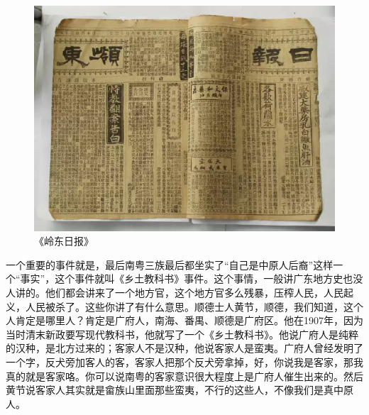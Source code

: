 \begin{figure}
	\centering
	\includegraphics[width=\textwidth]{images/image-76}
	\caption{《岭东日报》}
\end{figure}

一个重要的事件就是，最后南粤三族最后都坐实了“自己是中原人后裔”这样一个“事实”，这个事件就叫《乡土教科书》事件。这个事情，一般讲广东地方史也没人讲的。他们都会讲来了一个地方官，这个地方官多么残暴，压榨人民，人民起义，人民被杀了。这些你讲了有什么意思。顺德士人黄节，顺德，我们知道，这个人肯定是哪里人？肯定是广府人，南海、番禺、顺德是广府区。他在1907年，因为当时清末新政要写现代教科书，他就写了一个《乡土教科书》。他说广府人是纯粹的汉种，是北方过来的；客家人不是汉种，他说客家人是蛮夷。广府人曾经发明了一个字，反犬旁加客人的客，客家人把那个反犬旁拿掉，好，你说我是客家，那我真的就是客家咯。你可以说南粤的客家意识很大程度上是广府人催生出来的。然后黄节说客家人其实就是畲族山里面那些蛮夷，不行的这些人，不像我们是真中原人。

